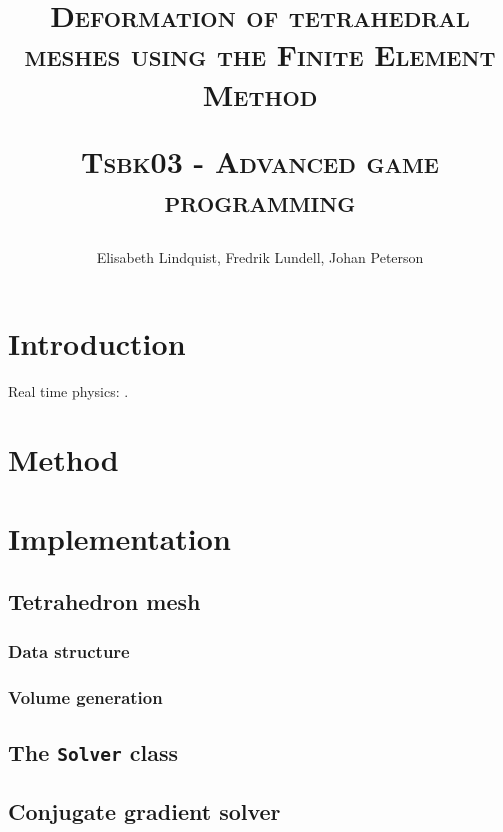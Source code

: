 \documentclass[10pt,a4paper]{article}
\author{Elisabeth Lindquist, Fredrik Lundell, Johan Peterson}
\title{\textsc{Deformation of tetrahedral meshes using the Finite Element Method}\\\begin{small}\textsc{Tsbk03 - Advanced game programming}\end{small}}
\begin{document}
\maketitle
\begin{abstract}

\end{abstract}
\pagebreak
\tableofcontents
\pagebreak

\section{Introduction}

Real time physics: \cite{rt_phys}.
\section{Method}

\subsection{}
\subsection{}
\subsection{}


\section{Implementation}


\subsection{Tetrahedron mesh}
\subsubsection{Data structure}
\subsubsection{Volume generation}

\subsection{The \texttt{Solver} class}
\subsection{Conjugate gradient solver}
\end{document}
